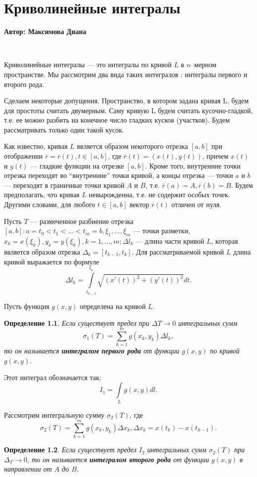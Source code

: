 \documentclass[12pt,titlepage]{report}
\newtheorem{object}{Определение}
\begin{document}
\chapter{Криволинейные интегралы}
\centerline{\bf Автор: Максимова Диана}
\vskip 3mm
\ \par Криволинейные интегралы --- это интегралы по кривой $L$ в $n$--мерном пространстве. Мы рассмотрим два вида
таких интегралов : интегралы первого и второго рода. 
\par Сделаем некоторые допущения. Пространство, в котором задана кривая L, будем для простоты считать двумерным. 
Саму кривую L будем считать кусочно-гладкой, т.е. ее можно разбить на конечное число гладких кусков (участков).
 Будем рассматривать только один такой кусок.
\par Как известно, кривая $L$ является образом некоторого отрезка $[a,b]$ при отображении $\overline r=
\overline r (t), t\in[a,b]$, где $\overline r (t)=(x(t),y(t))$, причем $x(t)$ и $y(t)$ --- гладкие функции
на отрезке $[a,b]$. Кроме того, внутренние точки отрезка переходят во ``внутренние'' точки кривой, а концы
отрезка --- точки $a$ и $b$ --- переходят в граничные точки кривой $A$ и $B$, т.е. $\overline r(a)=A,\overline r(b)=B$.
 Будем предполагать, что кривая $L$ невырожденна, т.е. не содержит особых точек. Другими словами, для любого 
$t\in[a,b]$ вектор $\overline r (t)$ отличен от нуля.
\par Пусть $T$ --- размеченное разбиение отрезка $[a,b] : a = t_0 < t_1 < \ldots < t_m = b, \xi_1,\ldots,\xi_m$ 
--- точки разметки, $x_k = x(\xi_k),y_k = y(\xi_k), k = 1,\ldots,m;\Delta l_k$ --- длина части кривой $L$, 
которая является образом отрезка $\Delta_k = [t_{k-1},t_k]$. Для рассматриваемой кривой $L$ длина кривой выражается
 по формуле
$$
\Delta l_k = \int\limits_{t_{k-1}}^{t_k}\sqrt {(x'(t))^2+(y'(t))^2}dt.
$$
\par Пусть функция $g(x,y)$ определена на кривой $L$.
\vskip 1mm
\begin{object}
Если существует предел при $\Delta T\to0$ интегральных сумм
$$
\sigma_1(T)=\sum\limits_{k=1}^m g(x_k,y_k)\Delta l_k,
$$
то он называется \textbf{интегралом первого рода} от функции $g(x,y)$ по кривой $g(x,y)$. 
\end{object}
\par Этот интеграл обозначается так:
$$
I_1=\int\limits_L g(x,y)dl.
$$
\par Рассмотрим интегральную сумму $\sigma_2(T)$, где
$$
\sigma_2(T)=\sum\limits_{k=1}^m g(x_k,y_k)\Delta x_k,\Delta x_k=x(t_k) - x(t_{k-1}).
$$
\begin{object}
Если существует предел $I_2$ интегральных сумм $\sigma_2(T)$ при $\Delta_T\to0$, то он называется \textbf{интегралом второго рода} от функции $g(x,y)$ в направлении от $A$ до $B$.
\end{object}
\end{document}
